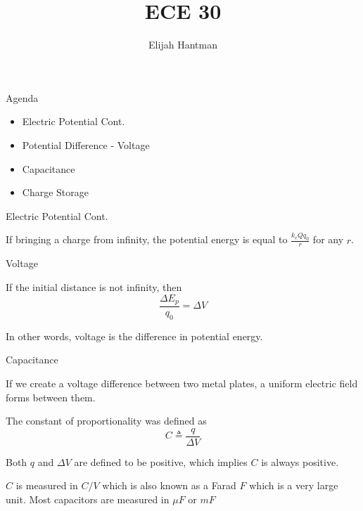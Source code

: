 \documentclass{report}
\title{\Huge{ECE 30}}
\author{\huge{Elijah Hantman}}
\date{}
\begin{document}
\maketitle
\newpage

\begin{description}
    \item {\large Agenda}
        \begin{itemize}
            \item Electric Potential Cont.
            \item Potential Difference - Voltage
            \item Capacitance
            \item Charge Storage
        \end{itemize}

    \item {\large Electric Potential Cont.}
        \begin{mdframed}
           If bringing a charge from infinity, the potential
           energy is equal to $\frac{k_e Q q_0}{r}$ for any
           $r$.
        \end{mdframed}
    \item {\large Voltage}
        \begin{mdframed}
            If the initial distance is not infinity, then
            \begin{displaymath}
                \frac{\Delta E_p}{q_0} = \Delta V
            \end{displaymath}

            In other words, voltage is the difference in potential
            energy.
        \end{mdframed}
    \item {\large Capacitance}
        \begin{mdframed}

            If we create a voltage difference between two
            metal plates, a uniform electric field forms
            between them.

            The constant of proportionality was defined as
            \begin{displaymath}
                C \triangleq \frac{q}{\Delta V}
            \end{displaymath}

            Both $q$ and  $\Delta V$ are defined to be positive,
            which implies $C$ is always positive. 

            $C$ is measured in  $\si{C/V}$ which is also known
            as a Farad $\si{F}$ which is a very large
            unit. Most capacitors are measured in
            $\si{\mu F}$ or  $\si{mF}$
            

\end{mdframed}
\end{description}
\end{document}
